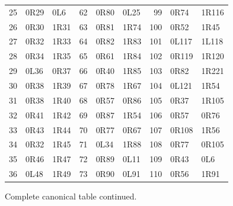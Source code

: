\begin{center}
\begin{tabular}{rll@{\qquad}rll@{\qquad}rll}
25 & 0R29 & 0L6 & 62 & 0R80 & 0L25 & 99 & 0R74 & 1R116\\
26 & 0R30 & 1R31 & 63 & 0R81 & 1R74 & 100 & 0R52 & 1R45\\
27 & 0R32 & 1R33 & 64 & 0R82 & 1R83 & 101 & 0L117 & 1L118\\
28 & 0R34 & 1R35 & 65 & 0R61 & 1R84 & 102 & 0R119 & 1R120\\
29 & 0L36 & 0R37 & 66 & 0R40 & 1R85 & 103 & 0R82 & 1R221\\
30 & 0R38 & 1R39 & 67 & 0R78 & 1R67 & 104 & 0L121 & 1R54\\
31 & 0R38 & 1R40 & 68 & 0R57 & 0R86 & 105 & 0R37 & 1R105\\
32 & 0R41 & 1R42 & 69 & 0R87 & 1R54 & 106 & 0R57 & 0R76\\
33 & 0R43 & 1R44 & 70 & 0R77 & 0R67 & 107 & 0R108 & 1R56\\
34 & 0R32 & 1R45 & 71 & 0L34 & 1R88 & 108 & 0R77 & 0R105\\
35 & 0R46 & 1R47 & 72 & 0R89 & 0L11 & 109 & 0R43 & 0L6\\
36 & 0L48 & 1R49 & 73 & 0R90 & 0L91 & 110 & 0R56 & 1R91\\
\bottomrule
\end{tabular}
\end{center}
\clearpage
\noindent Complete canonical table continued.
